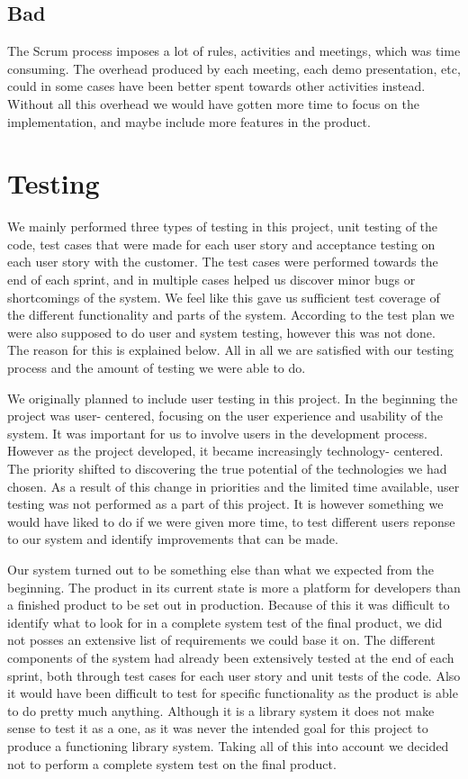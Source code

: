 \subsection*{Bad}
The Scrum process imposes a lot of rules, activities and meetings, which was time consuming. The overhead produced by each meeting, each demo presentation, etc, could in some cases have been better spent towards other activities instead. Without all this overhead we would have gotten more time to focus on the implementation, and maybe include more features in the product.


\section{Testing}
We mainly performed three types of testing in this project, unit testing of the code, test cases that were made for each user story and acceptance testing on each user story with the customer. The test cases were performed towards the end of each sprint, and in multiple cases helped us discover minor bugs or shortcomings of the system. We feel like this gave us sufficient test coverage of the different functionality and parts of the system. According to the test plan we were also supposed to do user and system testing, however this was not done. The reason for this is explained below. All in all we are satisfied with our testing process and the amount of testing we were able to do.

We originally planned to include user testing in this project. In the beginning the project was user- centered, focusing on the user experience and usability of the system. It was important for us to involve users in the development process. However as the project developed, it became increasingly technology- centered. The priority shifted to discovering the true potential of the technologies we had chosen. As a result of this change in priorities and the limited time available, user testing was not performed as a part of this project. It is however something we would have liked to do if we were given more time, to test different users reponse to our system and identify improvements that can be made.

Our system turned out to be something else than what we expected from the beginning. The product in its current state is more a platform for developers than a finished product to be set out in production. Because of this it was difficult to identify what to look for in a complete system test of the final product, we did not posses an extensive list of requirements we could base it on. The different components of the system had already been extensively tested at the end of each sprint, both through test cases for each user story and unit tests of the code. Also it would have been difficult to test for specific functionality as the product is able to do pretty much anything. Although it is a library system it does not make sense to test it as a one, as it was never the intended goal for this project to produce a functioning library system. Taking all of this into account we decided not to perform a complete system test on the final product.


